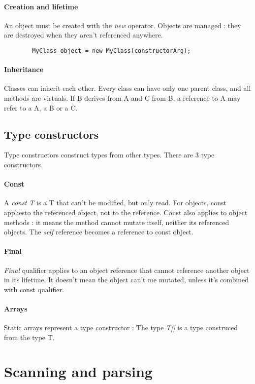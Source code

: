 \documentclass[a4paper, 12pt]{article}
\begin{document}
	\paragraph{Creation and lifetime}
	An object must be created with the \textit{new} operator. Objects are managed : they are destroyed when they aren't referenced anywhere.
	\begin{verbatim}
		MyClass object = new MyClass(constructorArg);
	\end{verbatim}
	\paragraph{Inheritance}
	Classes can inherit each other. Every class can have only one parent class, and all methods are virtuals. If B derives from A and C from B, a reference to A may refer to a A, a B or a C.
	
	\subsection{Type constructors}
	Type constructors construct types from other types. There are 3 type constructors.
	\paragraph{Const}
	A \textit{const T} is a T that can't be modified, but only read. For objects, const appliesto the referenced object, not to the reference.
	Const also applies to object methods : it means the method cannot mutate itself, neither its referenced objects. The \textit{self} reference becomes a reference to const object.
	\paragraph{Final}
	\textit{Final} qualifier applies to an object reference that cannot reference another object in its lifetime. It doesn't mean the object can't me mutated, unless it's combined with const qualifier.
	\paragraph{Arrays}
	Static arrays represent a type constructor : The type \textit{T[]} is a type construced from the type T.
	
	
	\newpage
	\section{Scanning and parsing}
\end{document}
